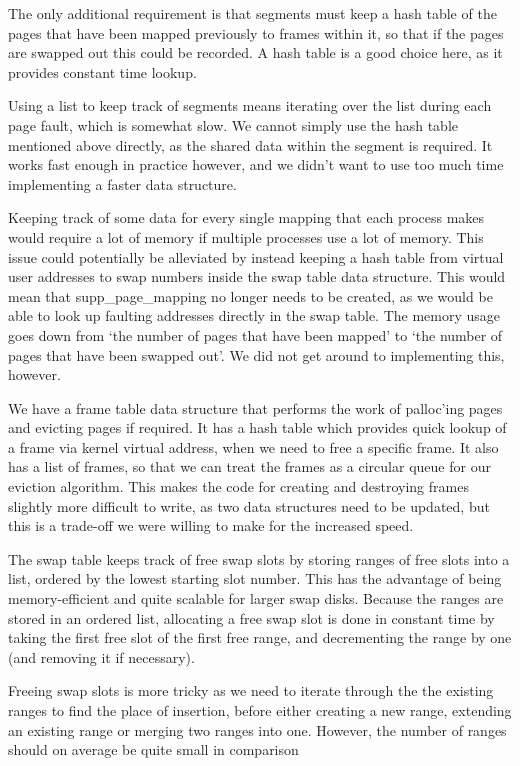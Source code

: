 The only additional requirement is that segments must keep a hash table of the
pages that have been mapped previously to frames within it, so that if the pages
are swapped out this could be recorded. A hash table is a good choice here, as
it provides constant time lookup.

Using a list to keep track of segments means iterating over the list during each
page fault, which is somewhat slow. We cannot simply use the hash table
mentioned above directly, as the shared data within the segment is required. It
works fast enough in practice however, and we didn't want to use too much time
implementing a faster data structure.

Keeping track of some data for every single mapping that each process makes
would require a lot of memory if multiple processes use a lot of memory. This
issue could potentially be alleviated by instead keeping a hash table from
virtual user addresses to swap numbers inside the swap table data
structure. This would mean that supp\_page\_mapping no longer needs to be
created, as we would be able to look up faulting addresses directly in the swap
table.  The memory usage goes down from `the number of pages that have been
mapped' to `the number of pages that have been swapped out'. We did not get
around to implementing this, however.

We have a frame table data structure that performs the work of palloc'ing pages
and evicting pages if required. It has a hash table which provides quick lookup
of a frame via kernel virtual address, when we need to free a specific frame. It
also has a list of frames, so that we can treat the frames as a circular queue
for our eviction algorithm. This makes the code for creating and destroying frames
slightly more difficult to write, as two data structures need to be updated, but
this is a trade-off we were willing to make for the increased speed.

The swap table keeps track of free swap slots by storing ranges of free slots into a list, ordered by the lowest starting slot number. This has the advantage of being memory-efficient and quite scalable for larger swap disks. Because the ranges are stored in an ordered list, allocating a free swap slot is done in constant time by taking the first free slot of the first free range, and decrementing the range by one (and removing it if necessary).

Freeing swap slots is more tricky as we need to iterate through the the existing ranges to find the place of insertion, before either creating a new range, extending an existing range or merging two ranges into one. However, the number of ranges should on average be quite small in comparison


